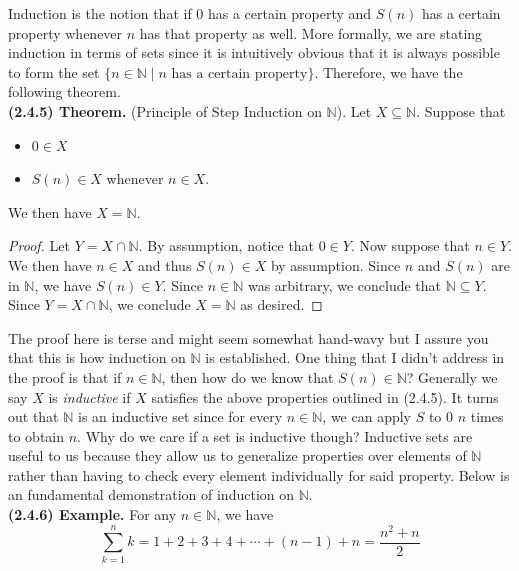 \documentclass[12pt]{book}
\def\N{{\mathbb{N}}}
\def\header #1{\noindent\textbf{#1}}
\begin{document}
Induction is the notion that if $0$ has a certain property and $S(n)$ has a certain property whenever $n$ has that property as well. More formally, we are stating induction in terms of sets since it is intuitively obvious that it is always possible to form the set $\{n\in\N\mid n\text{ has a certain property}\}$. Therefore, we have the following theorem.\\

\header{(2.4.5) Theorem.} (Principle of Step Induction on $\N$). Let $X\subseteq\N$. Suppose that 
\begin{itemize}
\item $0\in X$
\item $S(n)\in X$ whenever $n\in X$.
\end{itemize}
We then have $X=\N$.
\begin{proof}
Let $Y=X\cap\N$. By assumption, notice that $0\in Y$. Now suppose that $n\in Y$. We then have $n\in X$ and thus $S(n)\in X$ by assumption. Since $n$ and $S(n)$ are in $\N$, we have $S(n)\in Y$. Since $n\in\N$ was arbitrary, we conclude that $\N\subseteq Y$. Since $Y=X\cap\N$, we conclude $X=\N$ as desired.
\end{proof}

The proof here is terse and might seem somewhat hand-wavy but I assure you that this is how induction on $\N$ is established. One thing that I didn't address in the proof is that if $n\in\N$, then how do we know that $S(n)\in\N$? Generally we say $X$ is \textit{inductive} if $X$ satisfies the above properties outlined in (2.4.5). It turns out that $\N$ is an inductive set since for every $n\in\N$, we can apply $S$ to 0 $n$ times to obtain $n$. Why do we care if a set is inductive though? Inductive sets are useful to us because they allow us to generalize properties over elements of $\N$ rather than having to check every element individually for said property. Below is an fundamental demonstration of induction on $\N$.\\

\header{(2.4.6) Example.} For any $n\in\N$, we have
\[\sum_{k=1}^n k=1+2+3+4+\cdots+(n-1)+n=\frac{n^2+n}{2}\]
\end{document}
